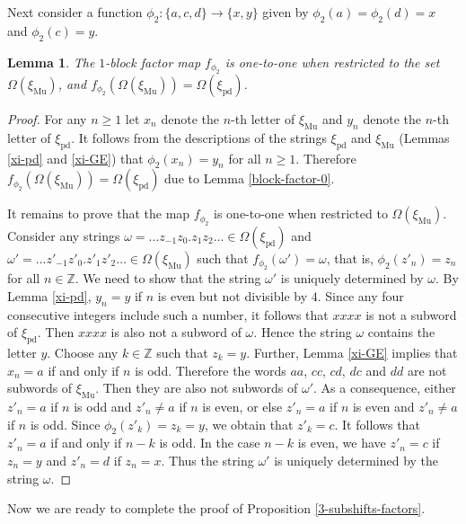 \documentclass[12pt]{article}
\newtheorem{lemma}[theorem]{Lemma}
\theoremstyle{definition}
\def\bZ{\mathbb{Z}}
\def\om{\omega}
\def\Om{\Omega}
\def\xipd{\xi_{\mathrm{pd}}}
\def\xiGE{\xi_{\mathrm{Mu}}}
\begin{document}
Next consider a function $\phi_2:\{a,c,d\}\to\{x,y\}$ given by 
$\phi_2(a)=\phi_2(d)=x$ and $\phi_2(c)=y$.

\begin{lemma}\label{block-factor-2}
The $1$-block factor map $f_{\phi_2}$ is one-to-one when restricted to the 
set $\Om(\xiGE)$, and $f_{\phi_2}(\Om(\xiGE))=\Om(\xipd)$.
\end{lemma}

\begin{proof}
For any $n\ge1$ let $x_n$ denote the $n$-th letter of $\xiGE$ and $y_n$ 
denote the $n$-th letter of $\xipd$.  It follows from the descriptions of 
the strings $\xipd$ and $\xiGE$ (Lemmas \ref{xi-pd} and \ref{xi-GE}) that 
$\phi_2(x_n)=y_n$ for all $n\ge1$.  Therefore 
$f_{\phi_2}(\Om(\xiGE))=\Om(\xipd)$ due to Lemma \ref{block-factor-0}.

It remains to prove that the map $f_{\phi_2}$ is one-to-one when restricted 
to $\Om(\xiGE)$.  Consider any strings $\om=\ldots z_{-1}z_0.z_1z_2\ldots 
\in\Om(\xipd)$ and $\om'=\ldots z'_{-1}z'_0.z'_1z'_2\ldots \in\Om(\xiGE)$ 
such that $f_{\phi_2}(\om')=\om$, that is, $\phi_2(z'_n)=z_n$ for all 
$n\in\bZ$.  We need to show that the string $\om'$ is uniquely determined 
by $\om$.  By Lemma \ref{xi-pd}, $y_n=y$ if $n$ is even but not divisible 
by $4$.  Since any four consecutive integers include such a number, it 
follows that $xxxx$ is not a subword of $\xipd$.  Then $xxxx$ is also not a 
subword of $\om$.  Hence the string $\om$ contains the letter $y$.  Choose 
any $k\in\bZ$ such that $z_k=y$.  Further, Lemma \ref{xi-GE} implies that 
$x_n=a$ if and only if $n$ is odd.  Therefore the words $aa$, $cc$, $cd$, 
$dc$ and $dd$ are not subwords of $\xiGE$.  Then they are also not subwords 
of $\om'$.  As a consequence, either $z'_n=a$ if $n$ is odd and $z'_n\ne a$ 
if $n$ is even, or else $z'_n=a$ if $n$ is even and $z'_n\ne a$ if $n$ is 
odd.  Since $\phi_2(z'_k)=z_k=y$, we obtain that $z'_k=c$.  It follows that 
$z'_n=a$ if and only if $n-k$ is odd.  In the case $n-k$ is even, we have 
$z'_n=c$ if $z_n=y$ and $z'_n=d$ if $z_n=x$.  Thus the string $\om'$ is 
uniquely determined by the string $\om$.
\end{proof}

Now we are ready to complete the proof of Proposition 
\ref{3-subshifts-factors}.
\end{document}
